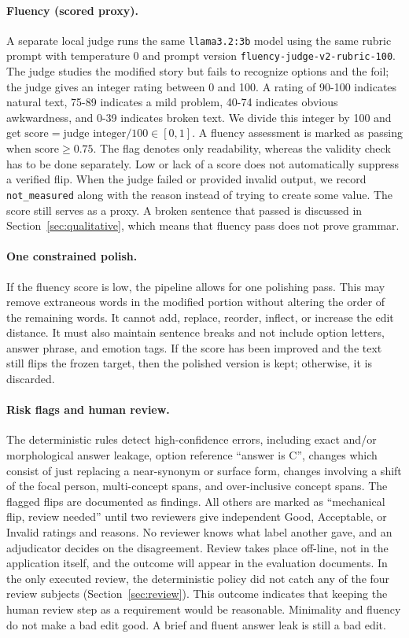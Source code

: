 \documentclass[11pt,a4paper]{article}
\begin{document}
\paragraph{Fluency (scored proxy).}
A separate local judge runs the same \texttt{llama3.2:3b} model using the
same rubric prompt with temperature 0 and prompt version
\texttt{fluency-judge-v2-rubric-100}. The judge studies the modified story but fails to recognize
options and the foil; the judge gives an integer rating between 0 and 100. A rating of 90-100
indicates natural text, 75-89 indicates a mild problem, 40-74 indicates obvious awkwardness, and
0-39 indicates broken text. We divide this integer by 100 and get $\text{score} = \text{judge
integer} / 100 \in [0,1]$. A fluency assessment is marked as passing when
$\text{score} \ge 0.75$. The flag denotes
only readability, whereas the validity check has to be done separately. Low or lack of a score
does not automatically suppress a verified flip. When the judge failed or provided invalid output,
we record \texttt{not\_measured} along with the reason instead of trying to create some value.
The score still serves as a proxy. A broken sentence that passed is discussed in
Section~\ref{sec:qualitative}, which means that fluency pass does not prove grammar.

\paragraph{One constrained polish.}
If the fluency score is low, the pipeline allows for one polishing pass.
This may remove extraneous words in the modified portion without altering the order
of the remaining words. It cannot add, replace, reorder, inflect, or increase the edit
distance. It must also maintain sentence breaks and not include option letters,
answer phrase, and emotion tags. If the score has been improved and the text still flips
the frozen target, then the polished version is kept; otherwise, it is discarded.

\paragraph{Risk flags and human review.}
The deterministic rules detect high-confidence errors, including exact and/or
morphological answer leakage, option reference ``answer is C'', changes which consist
of just replacing a near-synonym or surface form, changes involving a shift of the
focal person, multi-concept spans, and over-inclusive concept spans. The flagged flips are documented as findings. All others are
marked as ``mechanical flip, review needed'' until two reviewers give independent
Good, Acceptable, or Invalid ratings and reasons. No reviewer knows what label another gave, and an adjudicator decides on the disagreement.
Review takes place off-line, not in the application itself, and the outcome will appear in the evaluation documents. In the only executed review,
the deterministic policy did not catch any of the four review subjects (Section~\ref{sec:review}). This outcome indicates that keeping the human
review step as a requirement would be reasonable. Minimality and fluency do not make a bad edit good. A brief and fluent answer leak is
still a bad edit.
\end{document}
